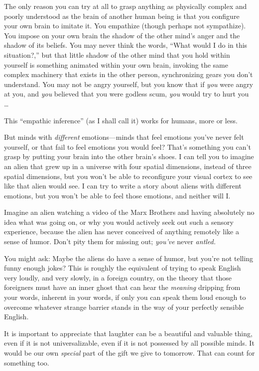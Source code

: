 {
 The only reason you can try at all to grasp anything as physically
complex and poorly understood as the brain of another human being is
that you configure your own brain to imitate it. You empathize (though
perhaps not sympathize). You impose on your own brain the shadow of the
other mind's anger and the shadow of its beliefs. You
may never think the words, ``What would I do in this
situation?,'' but that little shadow of the other
mind that you hold within yourself is something animated within your
own brain, invoking the same complex machinery that exists in the other
person, synchronizing gears you don't understand. You
may not be angry yourself, but you know that if \textit{you} were angry
at you, and \textit{you} believed that you were godless scum,
\textit{you} would try to hurt you \ldots}

{
 This ``empathic inference'' (as
I shall call it) works for humans, more or less.}

{
 But minds with \textit{different} emotions---minds that feel
emotions you've never felt yourself, or that fail to
feel emotions you would feel? That's something you
can't grasp by putting your brain into the other
brain's shoes. I can tell you to imagine an alien that
grew up in a universe with four spatial dimensions, instead of three
spatial dimensions, but you won't be able to
reconfigure your visual cortex to see like that alien would see. I can
try to write a story about aliens with different emotions, but you
won't be able to feel those emotions, and neither will
I.}

{
 Imagine an alien watching a video of the Marx Brothers and having
absolutely no idea what was going on, or why you would actively seek
out such a sensory experience, because the alien has never conceived of
anything remotely like a sense of humor. Don't pity
them for missing out; \textit{you've} never
\textit{antled.}}

{
 You might ask: Maybe the aliens do have a sense of humor, but
you're not telling funny enough jokes? This is roughly
the equivalent of trying to speak English very loudly, and very slowly,
in a foreign country, on the theory that those foreigners must have an
inner ghost that can hear the \textit{meaning} dripping from your
words, inherent in your words, if only you can speak them loud enough
to overcome whatever strange barrier stands in the way of your
perfectly sensible English.}

{
 It is important to appreciate that laughter can be a beautiful and
valuable thing, even if it is not universalizable, even if it is not
possessed by all possible minds. It would be our own \textit{special}
part of the gift we give to tomorrow. That can count for something
too.}

